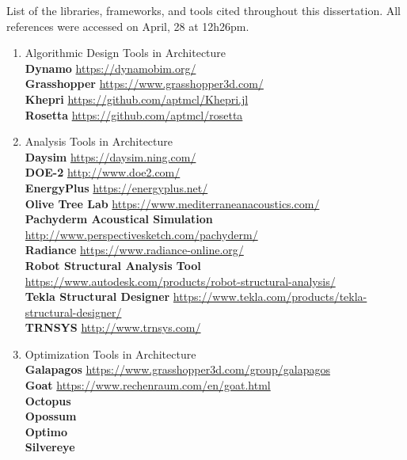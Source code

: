 List of the libraries, frameworks, and tools cited throughout this dissertation. All references were accessed on April, 28 at 12h26pm.
\begin{enumerate}[label=\Alph*]
\item Algorithmic Design Tools in Architecture \\
\textbf{Dynamo} \url{https://dynamobim.org/} \\
\textbf{Grasshopper} \url{https://www.grasshopper3d.com/} \\ 
\textbf{Khepri} \url{https://github.com/aptmcl/Khepri.jl} \\
\textbf{Rosetta} \url{https://github.com/aptmcl/rosetta} 

\item Analysis Tools in Architecture \\
\textbf{Daysim} \url{https://daysim.ning.com/} \\
\textbf{DOE-2} \url{http://www.doe2.com/} \\
\textbf{EnergyPlus} \url{https://energyplus.net/} \\
\textbf{Olive Tree Lab} \url{https://www.mediterraneanacoustics.com/} \\
\textbf{Pachyderm Acoustical Simulation} \url{http://www.perspectivesketch.com/pachyderm/} \\
\textbf{Radiance} \url{https://www.radiance-online.org/} \\
\textbf{Robot Structural Analysis Tool} \url{https://www.autodesk.com/products/robot-structural-analysis/} \\
\textbf{Tekla Structural Designer} \url{https://www.tekla.com/products/tekla-structural-designer/} \\
\textbf{TRNSYS} \url{http://www.trnsys.com/} 

\item Optimization Tools in Architecture \\
\textbf{Galapagos} \url{https://www.grasshopper3d.com/group/galapagos} \\
\textbf{Goat} \url{https://www.rechenraum.com/en/goat.html} \\ 
\textbf{Octopus} \cite{OCTOPUS} \\
\textbf{Opossum}  \cite{Wortmann2017Opossum} \\
\textbf{Optimo} \cite{OPTIMO} \\
\textbf{Silvereye} \cite{Cichocka2017SILVEREYE} \\


\end{enumerate}
